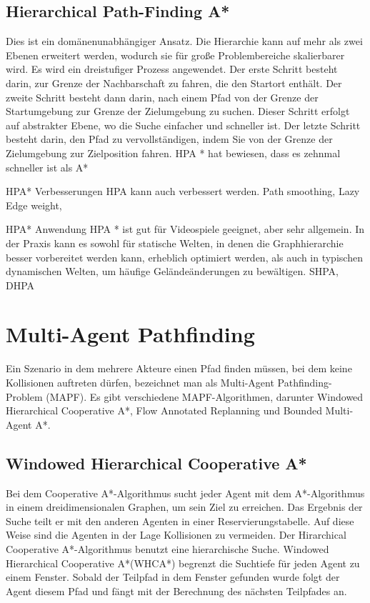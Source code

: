 \subsection{Hierarchical Path-Finding A*}
Dies ist ein domänenunabhängiger Ansatz. Die Hierarchie kann auf mehr als zwei Ebenen erweitert werden, wodurch sie für große Problembereiche skalierbarer wird. Es wird ein dreistufiger Prozess angewendet. Der erste Schritt besteht darin, zur Grenze der Nachbarschaft zu fahren, die den Startort enthält. Der zweite Schritt besteht dann darin, nach einem Pfad von der Grenze der Startumgebung zur Grenze der Zielumgebung zu suchen. Dieser Schritt erfolgt auf abstrakter Ebene, wo die Suche einfacher und schneller ist. Der letzte Schritt besteht darin, den Pfad zu vervollständigen, indem Sie von der Grenze der Zielumgebung zur Zielposition fahren. HPA * hat bewiesen, dass es zehnmal schneller ist als A*\cite{hpa}

HPA* Verbesserungen
HPA kann auch verbessert werden. Path smoothing, Lazy Edge weight,

HPA* Anwendung%
HPA * ist gut für Videospiele geeignet, aber sehr allgemein. In der Praxis kann es sowohl für statische Welten, in denen die Graphhierarchie besser vorbereitet werden kann, erheblich optimiert werden, als auch in typischen dynamischen Welten, um häufige Geländeänderungen zu bewältigen. 
SHPA, 
DHPA



\section{Multi-Agent Pathfinding}
Ein Szenario in dem mehrere Akteure einen Pfad finden müssen, bei dem keine Kollisionen auftreten dürfen, bezeichnet man als Multi-Agent Pathfinding-Problem (MAPF). Es gibt verschiedene MAPF-Algorithmen, darunter Windowed Hierarchical Cooperative A*, Flow Annotated Replanning und Bounded Multi-Agent A*.

\subsection{Windowed Hierarchical Cooperative A*}
Bei dem Cooperative A*-Algorithmus sucht jeder Agent mit dem A*-Algorithmus in einem dreidimensionalen Graphen, um sein Ziel zu erreichen. Das Ergebnis der Suche teilt er mit den anderen Agenten in einer Reservierungstabelle. Auf diese Weise sind die Agenten in der Lage Kollisionen zu vermeiden. Der Hirarchical Cooperative A*-Algorithmus benutzt eine hierarchische Suche. Windowed Hierarchical Cooperative A*(WHCA*) begrenzt die Suchtiefe für jeden Agent zu einem Fenster. Sobald der Teilpfad in dem Fenster gefunden wurde folgt der Agent diesem Pfad und fängt mit der Berechnung des nächsten Teilpfades an. 
